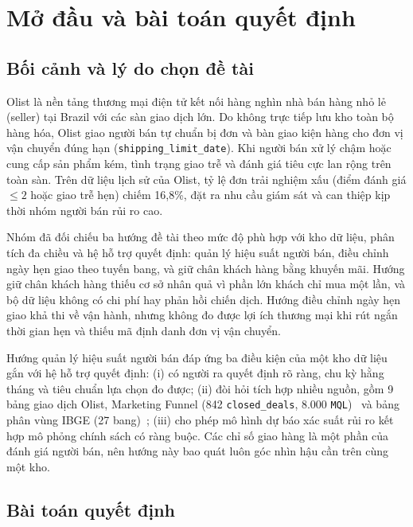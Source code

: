 \documentclass[a4paper]{article}
\begin{document}
\newpage

\section{Mở đầu và bài toán quyết định}
\label{sec:ch1}

\subsection{Bối cảnh và lý do chọn đề tài}
\label{subsec:1_1}

Olist là nền tảng thương mại điện tử kết nối hàng nghìn nhà bán hàng nhỏ lẻ (seller) tại Brazil với các sàn giao dịch lớn. Do không trực tiếp lưu kho toàn bộ hàng hóa, Olist giao người bán tự chuẩn bị đơn và bàn giao kiện hàng cho đơn vị vận chuyển đúng hạn (\texttt{shipping\_limit\_date}). Khi người bán xử lý chậm hoặc cung cấp sản phẩm kém, tình trạng giao trễ và đánh giá tiêu cực lan rộng trên toàn sàn. Trên dữ liệu lịch sử của Olist, tỷ lệ đơn trải nghiệm xấu (điểm đánh giá $\le 2$ hoặc giao trễ hẹn) chiếm 16,8\%, đặt ra nhu cầu giám sát và can thiệp kịp thời nhóm người bán rủi ro cao.

Nhóm đã đối chiếu ba hướng đề tài theo mức độ phù hợp với kho dữ liệu, phân tích đa chiều và hệ hỗ trợ quyết định: quản lý hiệu suất người bán, điều chỉnh ngày hẹn giao theo tuyến bang, và giữ chân khách hàng bằng khuyến mãi. Hướng giữ chân khách hàng thiếu cơ sở nhân quả vì phần lớn khách chỉ mua một lần, và bộ dữ liệu không có chi phí hay phản hồi chiến dịch. Hướng điều chỉnh ngày hẹn giao khả thi về vận hành, nhưng không đo được lợi ích thương mại khi rút ngắn thời gian hẹn và thiếu mã định danh đơn vị vận chuyển.

Hướng quản lý hiệu suất người bán đáp ứng ba điều kiện của một kho dữ liệu gắn với hệ hỗ trợ quyết định: (i) có người ra quyết định rõ ràng, chu kỳ hằng tháng và tiêu chuẩn lựa chọn đo được; (ii) đòi hỏi tích hợp nhiều nguồn, gồm 9 bảng giao dịch Olist, Marketing Funnel (842 \texttt{closed\_deals}, 8.000 \texttt{MQL})~\cite{bib:olist} và bảng phân vùng IBGE (27 bang)~\cite{bib:ibge}; (iii) cho phép mô hình dự báo xác suất rủi ro kết hợp mô phỏng chính sách có ràng buộc. Các chỉ số giao hàng là một phần của đánh giá người bán, nên hướng này bao quát luôn góc nhìn hậu cần trên cùng một kho.

\subsection{Bài toán quyết định}
\label{subsec:1_2}
\end{document}
